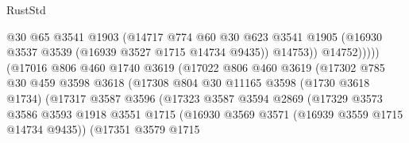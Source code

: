 \begin{lexlean}{RustStd}
\begin{coremodule}
                                            @30
                                            @65
                                            @3541
                                            @1903
                                            (@14717
                                              @774
                                              @60
                                              @30
                                              @623
                                              @3541
                                              @1905
                                              (@16930 @3537 @3539 (@16939 @3527 @1715 @14734 @9435))
                                              @14753))
                                          @14752)))))
                                (@17016
                                  @806
                                  @460
                                  @1740
                                  @3619
                                  (@17022
                                    @806
                                    @460
                                    @3619
                                    (@17302
                                      @785
                                      @30
                                      @459
                                      @3598
                                      @3618
                                      (@17308
                                        @804
                                        @30
                                        @11165
                                        @3598
                                        (@1730 @3618 @1734)
                                        (@17317
                                          @3587
                                          @3596
                                          (@17323
                                            @3587
                                            @3594
                                            @2869
                                            (@17329
                                              @3573
                                              @3586
                                              @3593
                                              @1918
                                              @3551
                                              @1715
                                              (@16930 @3569 @3571 (@16939 @3559 @1715 @14734 @9435))
                                              (@17351
                                                @3579
                                                @1715

\end{coremodule}
\end{lexlean}
